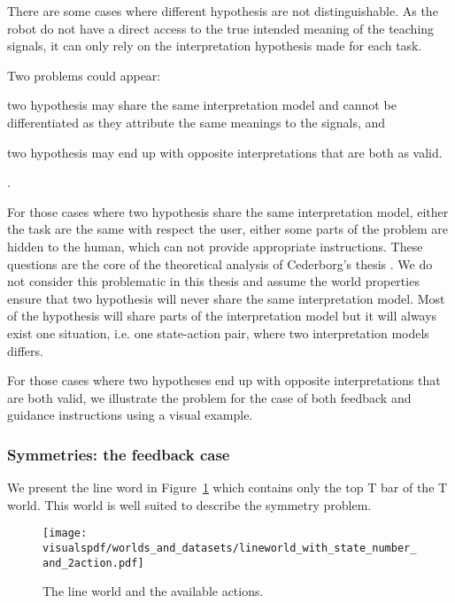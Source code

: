 There are some cases where different hypothesis are not distinguishable. As the robot do not have a direct access to the true intended meaning of the teaching signals, it can only rely on the interpretation hypothesis made for each task.

Two problems could appear: \begin{inparaenum}[(a)] \item two hypothesis may share the same interpretation model and cannot be differentiated as they attribute the same meanings to the signals, and \item two hypothesis may end up with opposite interpretations that are both as valid. \end{inparaenum}.

For those cases where two hypothesis share the same interpretation model, either the task are the same with respect the user, either some parts of the problem are hidden to the human, which can not provide appropriate instructions. These questions are the core of the theoretical analysis of Cederborg's thesis \cite{cederborg2014thesis,cederborg2014social}. We do not consider this problematic in this thesis and assume the world properties ensure that two hypothesis will never share the same interpretation model. Most of the hypothesis will share parts of the interpretation model but it will always exist one situation, i.e. one state-action pair, where two interpretation models differs.

For those cases where two hypotheses end up with opposite interpretations that are both valid, we illustrate the problem for the case of both feedback and guidance instructions using a visual example.

\subsubsection*{Symmetries: the feedback case}

We present the line word in Figure~\ref{fig:lineworld} which contains only the top T bar of the T world. This world is well suited to describe the symmetry problem. 

\begin{figure}[!htbp]
  \centering
  \texttt{[image: \\visualspdf/worlds\_and\_datasets/lineworld\_with\_state\_number\_and\_2action.pdf]}
  \caption{The line world and the available actions.}
  \label{fig:lineworld}
\end{figure}

